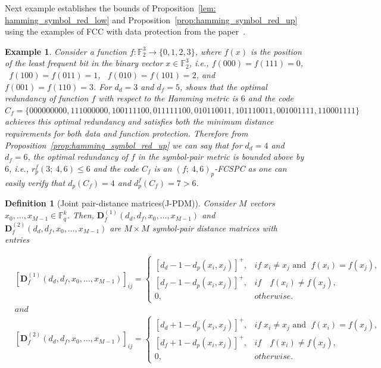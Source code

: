 \documentclass[11pt,draftclsnofoot,journal,onecolumn]{IEEEtran}
\newtheorem{definition}{Definition}
\newtheorem{example}{Example}
\begin{document}
    Next example establishes the bounds of Proposition~\ref{lem: hamming_symbol_red_low} and Proposition~\ref{prop:hamming_symbol_red_up} using the examples of FCC with data protection from the paper~\cite{rajput2025function}.
    \begin{example}
        Consider a function $f: \mathbb{F}_2^3 \to \{0,1,2,3\}$, where $f(x)$ is the position of the least frequent bit in the binary vector $x \in \mathbb{F}_2^3$, i.e., $f(000) = f(111) = 0$, \ $f(100)= f(011) = 1$, \ $f(010) = f(101) = 2$, and \ $f(001) = f(110) = 3$. For $d_d = 3$ and $d_f = 5$, \cite[Example 5]{rajput2025function} shows that the optimal redundancy of function $f$ with respect to the Hamming metric is $6$ and the code $C_f =\{000000000, 111000000, 100111100, 011111100, 010110011, 101110011, 001001111, 110001111\}$ achieves this optimal redundancy and satisfies both the minimum distance requirements for both data and function protection. Therefore from Proposition~\ref{prop:hamming_symbol_red_up} we can say that for $d_d = 4$ and $d_f = 6$, the optimal redundancy of $f$ in the symbol-pair metric is bounded above by $6$, i.e., $r_p^f(3; \ 4,6) \leq 6$ and the code $C_f$ is an $(f; \ 4,6)_p$-FCSPC as one can easily verify that $d_p(C_f) = 4$ and $d_p^f(C_f) = 7>6$.
    \end{example}


    \begin{definition}[Joint pair-distance matrices(J-PDM)] 
    \label{def:J-PDM}
    Consider $M$ vectors $x_0, \ldots , {x_{M-1}} \in {\mathbb{F}^k_q}$. Then,  $\boldsymbol{D}_f^{(1)}(d_d,d_f, x_0, \ldots , x_{M-1})$ and
    $\boldsymbol{D}_f^{(2)}(d_d,d_f, x_0, \ldots , x_{M-1})$  are $M \times M$  symbol-pair distance matrices with entries
 
    \begin{align*}
        &[\boldsymbol{D}_f^{(1)}(d_d,d_f, x_0, \ldots , x_{M-1})]_{ij}=   
        \begin{cases}
           [d_d - 1 - d_p(x_i, x_j)]^+ , & if \; x_i \neq x_j \text{ and } \; f (x_i) = f(x_j),\\
           [d_f -1  - d_p(x_i, x_j)]^+ , & if \quad f (x_i) \neq f(x_j),\\
           0, & otherwise.
        \end{cases}\\  
    & and \\
        &[\boldsymbol{D}_f^{(2)}(d_d,d_f, x_0, \ldots, x_{M-1})]_{ij}=   
        \begin{cases}
           [d_d + 1 - d_p(x_i, x_j)]^+ , & if \; x_i \neq x_j \text{ and } \; f (x_i) = f(x_j),\\
           [d_f + 1 - d_p(x_i, x_j)]^+ , & if \quad f (x_i) \neq f(x_j),\\
           0, & otherwise.
        \end{cases}
    \end{align*}
    \end{definition}
\end{document}
